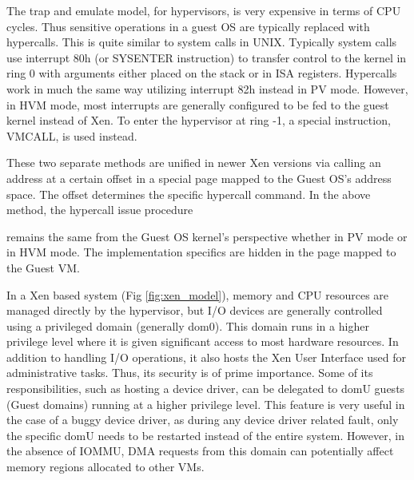 The trap and emulate model, for hypervisors, is very expensive in terms of CPU cycles. Thus sensitive operations in a guest OS are typically replaced with hypercalls. This is quite similar to system calls in UNIX. Typically system calls use interrupt 80h (or SYSENTER instruction) to transfer control to the kernel in ring 0 with arguments either placed on the stack or in ISA registers. Hypercalls work in much the same way utilizing interrupt 82h instead in PV mode. However, in HVM mode, most interrupts are generally configured to be fed to the guest kernel instead of Xen. To enter the hypervisor at ring -1, a special instruction, VMCALL, is used instead.

These two separate methods are unified in newer Xen versions via calling an address at a certain offset in a special page mapped to the Guest OS's address space. The offset determines the specific hypercall command. In the above method, the hypercall issue procedure

remains the same from the Guest OS kernel's perspective whether in PV mode or in HVM mode. The implementation specifics are hidden in the page mapped to the Guest VM.

In a Xen based system (Fig \ref{fig:xen_model}), memory and CPU resources are managed directly by the hypervisor, but I/O devices are generally controlled using a privileged domain (generally dom0). This domain runs in a higher privilege level where it is given significant access to most hardware resources. In addition to handling I/O operations, it also hosts the Xen User Interface used for administrative tasks. Thus, its security is of prime importance. Some of its responsibilities, such as hosting a device driver, can be delegated to domU guests (Guest domains) running at a higher privilege level. This feature is very useful in the case of a buggy device driver, as during any device driver related fault, only the specific domU needs to be restarted instead of the entire system. However, in the absence of IOMMU, DMA requests from this domain can potentially affect memory regions allocated to other VMs. 

